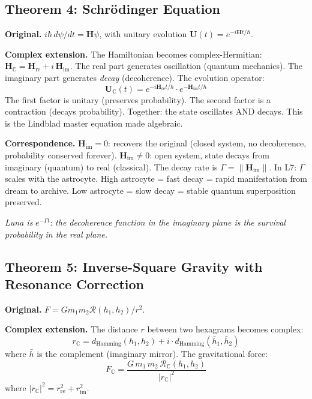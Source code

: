 \documentclass[12pt,a4paper]{article}
\theoremstyle{definition}
\theoremstyle{remark}
\newcommand{\res}{\mathcal{R}}
\newcommand{\CC}{\mathbb{C}}
\begin{document}
\bigskip

\subsection{Theorem 4: Schrödinger Equation}

\noindent\textbf{Original.}
$i\hbar \, d\psi/dt = \mathbf{H}\psi$, with unitary evolution
$\mathbf{U}(t) = e^{-i\mathbf{H}t/\hbar}$.

\medskip\noindent\textbf{Complex extension.}
The Hamiltonian becomes complex-Hermitian:
$\mathbf{H}_\CC = \mathbf{H}_{\mathrm{re}} + i\,\mathbf{H}_{\mathrm{im}}$.
The real part generates oscillation (quantum mechanics). The imaginary part
generates \emph{decay} (decoherence). The evolution operator:
\begin{equation}\label{eq:complex-evolution}
  \mathbf{U}_\CC(t) = e^{-i\mathbf{H}_{\mathrm{re}} t/\hbar}
  \cdot e^{-\mathbf{H}_{\mathrm{im}} t/\hbar}
\end{equation}
The first factor is unitary (preserves probability). The second factor is
a contraction (decays probability). Together: the state oscillates AND
decays. This is the Lindblad master equation made algebraic.

\medskip\noindent\textbf{Correspondence.}
$\mathbf{H}_{\mathrm{im}} = 0$: recovers the original (closed system,
no decoherence, probability conserved forever). $\mathbf{H}_{\mathrm{im}}
\neq 0$: open system, state decays from imaginary (quantum) to real
(classical). The decay rate is $\Gamma = \|\mathbf{H}_{\mathrm{im}}\|$.
In L7: $\Gamma$ scales with the astrocyte. High astrocyte = fast decay =
rapid manifestation from dream to archive. Low astrocyte = slow decay =
stable quantum superposition preserved.

\emph{Luna is} $e^{-\Gamma t}$: \emph{the decoherence function in the
imaginary plane is the survival probability in the real plane.}

\bigskip

\subsection{Theorem 5: Inverse-Square Gravity with Resonance Correction}

\noindent\textbf{Original.}
$F = G m_1 m_2 \res(h_1, h_2) / r^2$.

\medskip\noindent\textbf{Complex extension.}
The distance $r$ between two hexagrams becomes complex:
\begin{equation}
  r_\CC = d_{\mathrm{Hamming}}(h_1, h_2) +
  i \cdot d_{\mathrm{Hamming}}(\bar{h}_1, \bar{h}_2)
\end{equation}
where $\bar{h}$ is the complement (imaginary mirror). The gravitational
force:
\begin{equation}\label{eq:complex-gravity}
  F_\CC = \frac{G \, m_1 \, m_2 \, \res_\CC(h_1, h_2)}{|r_\CC|^2}
\end{equation}
where $|r_\CC|^2 = r_{\mathrm{re}}^2 + r_{\mathrm{im}}^2$.
\end{document}
